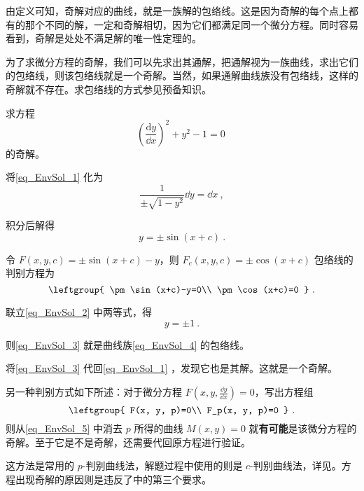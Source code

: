 由定义可知，奇解对应的曲线，就是一族解的包络线。这是因为奇解的每个点上都有的那个不同的解，一定和奇解相切，因为它们都满足同一个微分方程。同时容易看到，奇解是处处不满足解的唯一性定理的。

为了求微分方程的奇解，我们可以先求出其通解，把通解视为一族曲线，求出它们的包络线，则该包络线就是一个奇解。当然，如果通解曲线族没有包络线，这样的奇解就不存在。求包络线的方式参见预备知识。

\begin{example}{}
求方程
\begin{equation}\label{eq_EnvSol_1}
(\frac{\mathrm{d} y}{\dd x})^2+y^2-1=0~
\end{equation}
的奇解。

将\autoref{eq_EnvSol_1} 化为
\begin{equation}
\frac{1}{\pm\sqrt{1-y^2}}\dd y=\dd x~,
\end{equation}

积分后解得
\begin{equation}\label{eq_EnvSol_4}
y=\pm\sin(x+c)~.
\end{equation}

令 $F(x, y, c)=\pm\sin(x+c)-y$，则 $F_c(x, y, c)=\pm\cos(x+c)$ 包络线的判别方程为
\begin{equation}\label{eq_EnvSol_2}
\leftgroup{
    \pm\sin(x+c)-y=0\\
    \pm\cos(x+c)=0
}~.
\end{equation}

联立\autoref{eq_EnvSol_2} 中两等式，得
\begin{equation}\label{eq_EnvSol_3}
y=\pm 1~.
\end{equation}

则\autoref{eq_EnvSol_3} 就是曲线族\autoref{eq_EnvSol_4} 的包络线。

将\autoref{eq_EnvSol_3} 代回\autoref{eq_EnvSol_1} ，发现它也是其解。这就是一个奇解。


\end{example}

另一种判别方式如下所述：对于微分方程 $F(x, y, \frac{\dd y}{\dd x})=0$，写出方程组
\begin{equation}\label{eq_EnvSol_5}
\leftgroup{
    F(x, y, p)=0\\
    F_p(x, y, p)=0
}~.
\end{equation}
则从\autoref{eq_EnvSol_5} 中消去 $p$ 所得的曲线 $M(x, y)=0$ 就\textbf{有可能}是该微分方程的奇解。至于它是不是奇解，还需要代回原方程进行验证。

这方法是常用的 $p$-判别曲线法，解题过程中使用的则是 $c$-判别曲线法，详见。方程出现奇解的原因则是违反了中的第三个要求。


